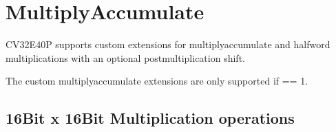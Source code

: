 \documentclass[letterpaper,10pt,english]{sphinxmanual}
\begin{document}
\section{Multiply\sphinxhyphen{}Accumulate}
\label{\detokenize{instruction_set_extensions:multiply-accumulate}}\label{\detokenize{instruction_set_extensions:corev-multiply-accumulate}}
\sphinxAtStartPar
CV32E40P supports custom extensions for multiply\sphinxhyphen{}accumulate and half\sphinxhyphen{}word multiplications with
an optional post\sphinxhyphen{}multiplication shift.

\sphinxAtStartPar
The custom multiply\sphinxhyphen{}accumulate extensions are only supported if  == 1.


\subsection{16\sphinxhyphen{}Bit x 16\sphinxhyphen{}Bit Multiplication operations}
\label{\detokenize{instruction_set_extensions:bit-x-16-bit-multiplication-operations}}
\end{document}
